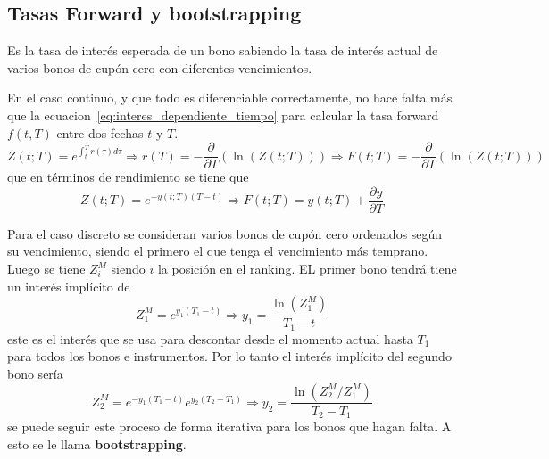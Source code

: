 \subsection{Tasas Forward y bootstrapping}\label{sec:forward_bootstrapping}
Es la tasa de interés esperada de un bono sabiendo la tasa de interés actual de varios bonos de cupón cero con diferentes vencimientos. 

En el caso continuo, y que todo es diferenciable correctamente, no hace falta más que la ecuacion~\eqref{eq:interes_dependiente_tiempo} para calcular la tasa forward $f(t, T)$ entre dos fechas $t$ y $T$. 
\[
    Z(t; T) = e^{\int_{t}^{T} r(\tau) d\tau} \Rightarrow r(T) = -\frac{\partial}{\partial T} \left( \ln(Z(t;T)) \right) \Rightarrow F(t;T) = -\frac{\partial}{\partial T} \left( \ln(Z(t;T)) \right) 
\]
que en términos de rendimiento se tiene que
\[
    Z(t; T) = e^{-y(t;T)(T-t)} \Rightarrow \boxed{F(t;T) = y(t;T) + \frac{\partial y}{\partial T}}
\]



Para el caso discreto se consideran varios bonos de cupón cero ordenados según su vencimiento, siendo el primero el que tenga el vencimiento más temprano. Luego se tiene $Z_i^M$ siendo $i$ la posición en el ranking. EL primer bono tendrá tiene un interés implícito de
\[
    Z_1^M = e^{y_1(T_1-t)} \Rightarrow y_1 = \frac{\ln(Z_1^M)}{T_1-t}
\]
este es el interés que se usa para descontar desde el momento actual hasta  $T_1$ para todos los bonos e instrumentos. Por lo tanto el interés implícito del segundo bono sería
\[
    Z_2^M = e^{-y_1(T_1-t)} e^{y_2(T_2-T_1)} \Rightarrow y_2 = \frac{\ln(Z_2^M/Z_1^M)}{T_2-T_1}
\]
se puede seguir este proceso de forma iterativa para los bonos que hagan falta. A esto se le llama \textbf{bootstrapping}.







